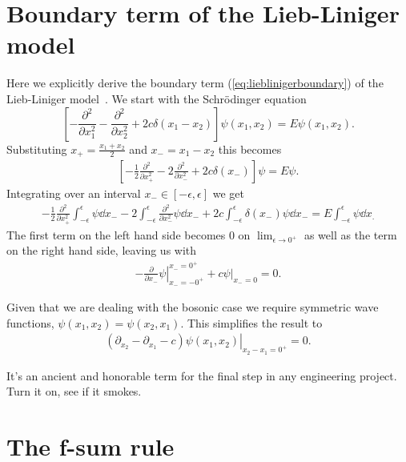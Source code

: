 \documentclass[11pt, a4paper]{report} %
\begin{document}
\chapter{Boundary term of the Lieb-Liniger model}\label{cha:boundary}

Here we explicitly derive the boundary term (\cref{eq:lieblinigerboundary}) of the Lieb-Liniger model~\cite{Caux2015}.
We start with the Schrödinger equation
\begin{equation}
	\left[- \frac{\partial^2}{\partial x_1^2} - \frac{\partial^2}{\partial x_2^2} + 2c \delta(x_1 - x_2)\right] \psi(x_1, x_2) = E \psi(x_1,x_2).
\end{equation} 
Substituting \(x_+ = \frac{x_1+x_2}{2}\) and \(x_-=x_1-x_2\) this becomes
\begin{align}
  \label{eq:17}
  	\left[-\frac{1}{2}\frac{\partial^2}{\partial x_+^2} - 2\frac{\partial^2}{\partial x_-^2} + 2c \delta(x_-)\right] \psi = E\psi.
\end{align}
Integrating over an interval \(x_-\in[-\epsilon,\epsilon]\) we get
\begin{align}
  \label{eq:18}
  -\frac{1}{2} \frac{\partial^2}{\partial x_+^2} \int_{-\epsilon}^{\epsilon} \psi \dd x_- - 2 \int_{-\epsilon}^{\epsilon} \frac{\partial^2}{\partial x_-^2}\psi \dd x_- + 2c\int_{-\epsilon}^{\epsilon} \delta(x_-)\psi \dd x_- = E\int_{-\epsilon}^{\epsilon} \psi \dd x_.
\end{align}
The first term on the left hand side becomes 0 on \(\lim_{\epsilon\to0^+}\) as well as the term on the right hand side, leaving us with
\begin{align}
  \label{eq:19}
  \left.- \frac{\partial}{\partial x_-} \psi \right|_{x_-=-0^+}^{x_-=0^+}  + \left.c\psi\right|_{x_-=0} = 0.
\end{align}

Given that we are dealing with the bosonic case we require symmetric wave functions, \(\psi(x_1,x_2)=\psi(x_2,x_1)\).
This simplifies the result to
\begin{align}
  \label{eq:20}
  \left.(\partial_{x_2} - \partial_{x_1} - c) \psi(x_1, x_2)\right|_{x_2-x_1=0^+} = 0.
\end{align}

\begin{savequote}[50mm]
It's an ancient and honorable term for the final step in any engineering project. Turn it on, see if it smokes.
\end{savequote}

\chapter{The f-sum rule}\label{cha:f-sum-rule}
\end{document}
